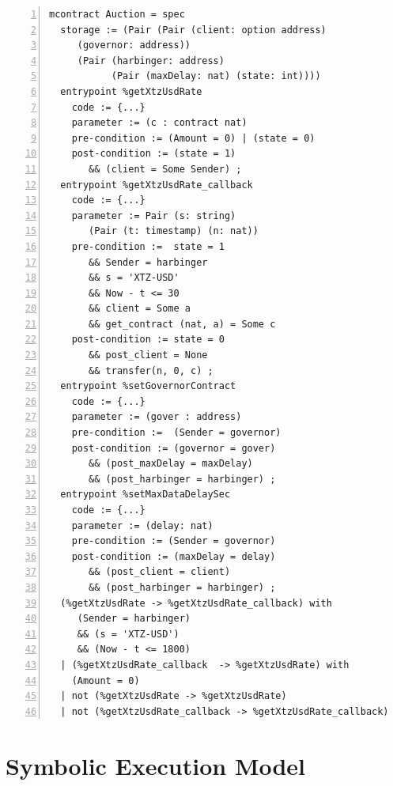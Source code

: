 \documentclass[a4paper,USenglish,cleveref, autoref, thm-restate]{lipics-v2021}
\begin{document}
\begin{lstlisting}[float=tp,captionpos=b,caption={Kolibri oracle contract specification},label={lst:kolibri-contract-specification},numbers=left]
mcontract Auction = spec 
  storage := (Pair (Pair (client: option address) 
     (governor: address))
     (Pair (harbinger: address) 
           (Pair (maxDelay: nat) (state: int))))
  entrypoint %getXtzUsdRate
    code := {...}
    parameter := (c : contract nat) 
    pre-condition := (Amount = 0) | (state = 0)
    post-condition := (state = 1) 
       && (client = Some Sender) ;
  entrypoint %getXtzUsdRate_callback
    code := {...}
    parameter := Pair (s: string) 
       (Pair (t: timestamp) (n: nat))
    pre-condition :=  state = 1 
       && Sender = harbinger  
       && s = 'XTZ-USD' 
       && Now - t <= 30 
       && client = Some a 
       && get_contract (nat, a) = Some c    
    post-condition := state = 0 
       && post_client = None 
       && transfer(n, 0, c) ;
  entrypoint %setGovernorContract
    code := {...}
    parameter := (gover : address) 
    pre-condition :=  (Sender = governor)                  
    post-condition := (governor = gover) 
       && (post_maxDelay = maxDelay) 
       && (post_harbinger = harbinger) ;
  entrypoint %setMaxDataDelaySec
    code := {...}
    parameter := (delay: nat)
    pre-condition := (Sender = governor)             
    post-condition := (maxDelay = delay) 
       && (post_client = client) 
       && (post_harbinger = harbinger) ;
  (%getXtzUsdRate -> %getXtzUsdRate_callback) with
     (Sender = harbinger)
     && (s = 'XTZ-USD') 
     && (Now - t <= 1800)  
  | (%getXtzUsdRate_callback  -> %getXtzUsdRate) with 
    (Amount = 0) 
  | not (%getXtzUsdRate -> %getXtzUsdRate) 
  | not (%getXtzUsdRate_callback -> %getXtzUsdRate_callback)
\end{lstlisting}


\section{Symbolic Execution Model}
\label{sec:symbolic-execution-model}
\end{document}
